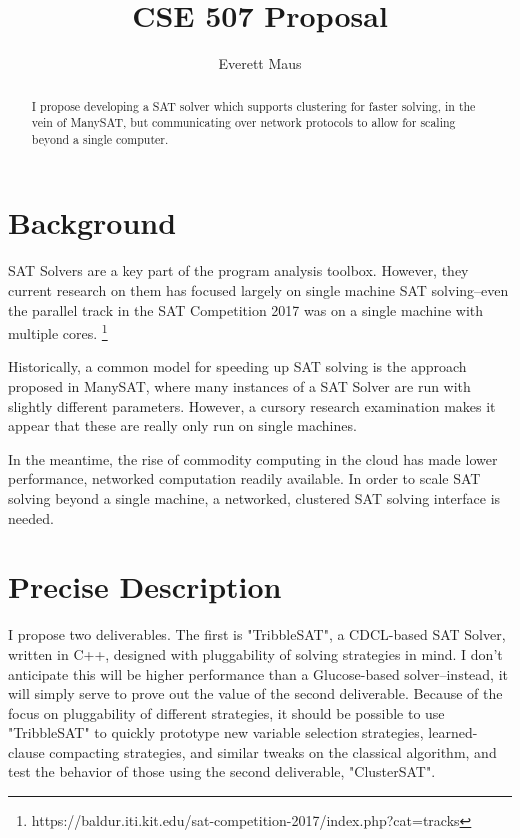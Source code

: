 \documentclass[10pt]{article}
\title{CSE 507 Proposal}
\author{Everett Maus}
\begin{document}
\maketitle

\begin{abstract}
  I propose developing a SAT solver which supports clustering for faster solving, in the 
  vein of ManySAT, but communicating over network protocols to allow for scaling beyond
  a single computer.
\end{abstract}

\section{Background}
SAT Solvers are a key part of the program analysis toolbox.  However, they current research on
  them has focused largely on single machine SAT solving--even the parallel track in the SAT 
  Competition 2017 was on a single machine with multiple cores. \footnote{https://baldur.iti.kit.edu/sat-competition-2017/index.php?cat=tracks}

  Historically, a common model for speeding up SAT solving is the approach proposed in ManySAT,
  where many instances of a SAT Solver are run with slightly different parameters.  However,
  a cursory research examination makes it appear that these are really only run on single machines.

  In the meantime, the rise of commodity computing in the cloud has made lower performance, networked
  computation readily available.  In order to scale SAT solving beyond a single machine, a networked, clustered
  SAT solving interface is needed.

\section{Precise Description}

  I propose two deliverables.  The first is "TribbleSAT", a CDCL-based SAT Solver, 
  written in C++, designed with pluggability of solving strategies in mind.  I don't anticipate
  this will be higher performance than a Glucose-based solver--instead, it will simply serve to
  prove out the value of the second deliverable.  Because of the focus on pluggability of different
  strategies, it should be possible to use "TribbleSAT" to quickly prototype new variable
  selection strategies, learned-clause compacting strategies, and similar tweaks on the classical
  algorithm, and test the behavior of those using the second deliverable, "ClusterSAT".
\end{document}
